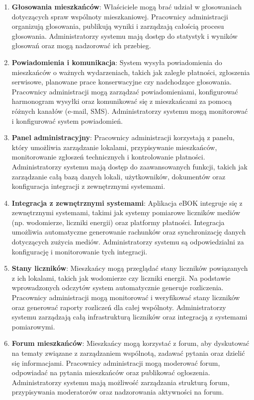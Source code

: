 \begin{enumerate}[label=\arabic*.,labelwidth=\widthof{10}]
	\item \textbf{Głosowania mieszkańców}: Właściciele mogą brać udział w głosowaniach dotyczących spraw wspólnoty mieszkaniowej. Pracownicy administracji organizują głosowania, publikują wyniki i zarządzają całością procesu głosowania. Administratorzy systemu mają dostęp do statystyk i wyników głosowań oraz mogą nadzorować ich przebieg.
	
	\item \textbf{Powiadomienia i komunikacja}: System wysyła powiadomienia do mieszkańców o ważnych wydarzeniach, takich jak zaległe płatności, zgłoszenia serwisowe, planowane prace konserwacyjne czy nadchodzące głosowania. Pracownicy administracji mogą zarządzać powiadomieniami, konfigurować harmonogram wysyłki oraz komunikować się z mieszkańcami za pomocą różnych kanałów (e-mail, SMS). Administratorzy systemu mogą monitorować i konfigurować system powiadomień.
	
	\item \textbf{Panel administracyjny}: Pracownicy administracji korzystają z panelu, który umożliwia zarządzanie lokalami, przypisywanie mieszkańców, monitorowanie zgłoszeń technicznych i kontrolowanie płatności. Administratorzy systemu mają dostęp do zaawansowanych funkcji, takich jak zarządzanie całą bazą danych lokali, użytkowników, dokumentów oraz konfiguracja integracji z zewnętrznymi systemami.
	
	\item \textbf{Integracja z zewnętrznymi systemami}: Aplikacja eBOK integruje się z zewnętrznymi systemami, takimi jak systemy pomiarowe liczników mediów (np. wodomierze, liczniki energii) oraz platformy płatności. Integracja umożliwia automatyczne generowanie rachunków oraz synchronizację danych dotyczących zużycia mediów. Administratorzy systemu są odpowiedzialni za konfigurację i monitorowanie tych integracji.
	
	\item \textbf{Stany liczników}: Mieszkańcy mogą przeglądać stany liczników powiązanych z ich lokalami, takich jak wodomierze czy liczniki energii. Na podstawie wprowadzonych odczytów system automatycznie generuje rozliczenia. Pracownicy administracji mogą monitorować i weryfikować stany liczników oraz generować raporty rozliczeń dla całej wspólnoty. Administratorzy systemu zarządzają całą infrastrukturą liczników oraz integracją z systemami pomiarowymi.
	
	\item \textbf{Forum mieszkańców}: Mieszkańcy mogą korzystać z forum, aby dyskutować na tematy związane z zarządzaniem wspólnotą, zadawać pytania oraz dzielić się informacjami. Pracownicy administracji mogą moderować forum, odpowiadać na pytania mieszkańców oraz publikować ogłoszenia. Administratorzy systemu mają możliwość zarządzania strukturą forum, przypisywania moderatorów oraz nadzorowania aktywności na forum.
	
\end{enumerate}

